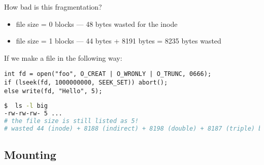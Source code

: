 \documentclass[../../lecture_notes.tex]{subfiles}
\begin{document}
How bad is this fragmentation?
\begin{itemize}
	\item file size = 0 blocks --- 48 bytes wasted for the inode
	\item file size = 1 blocks --- 44 bytes + 8191 bytes = 8235 bytes wasted
\end{itemize}
If we make a file in the following way:
\begin{lstlisting}
int fd = open("foo", O_CREAT | O_WRONLY | O_TRUNC, 0666);
if (lseek(fd, 1000000000, SEEK_SET)) abort();
else write(fd, "Hello", 5);
\end{lstlisting}\begin{lstlisting}[language=sh]
$  ls -l big
-rw-rw-rw- 5 ...
# the file size is still listed as 5!
# wasted 44 (inode) + 8188 (indirect) + 8198 (double) + 8187 (triple) bytes!
\end{lstlisting}


\subsection{Mounting}
\end{document}
